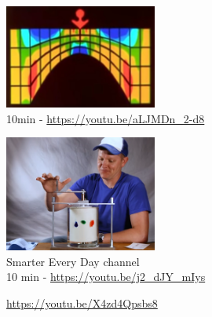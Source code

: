 
\begin{center}
\includegraphics[width=5cm]{images/youtube/superold}\\
10min - \url{https://youtu.be/aLJMDn_2-d8}
\end{center}

\begin{center}
\includegraphics[width=5cm]{images/youtube/smarter}\\
Smarter Every Day channel\\
10 min - \url{https://youtu.be/j2_dJY_mIys}
\end{center}


\url{https://youtu.be/X4zd4Qpsbs8}
